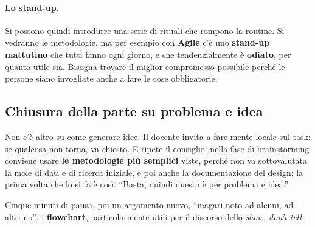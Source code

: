 \paragraph{Lo stand-up.} Si possono quindi introdurre una serie di rituali che
rompono la routine. Si vedranno le metodologie, ma per esempio con
\textbf{Agile} c'è uno \textbf{stand-up mattutino} che tutti fanno ogni
giorno, e che tendenzialmente è \textbf{odiato}, per quanto utile sia. Bisogna
trovare il miglior compromesso possibile perché le persone siano invogliate
anche a fare le cose obbligatorie.

\subsection{Chiusura della parte su problema e idea}

Non c'è altro su come generare idee. Il docente invita a fare mente locale
sul task: se qualcosa non torna, va chiesto. E ripete il consiglio: nella
fase di brainstorming conviene usare \textbf{le metodologie più semplici}
viste, perché non va sottovalutata la mole di dati e di ricerca iniziale, e
poi anche la documentazione del design; la prima volta che lo si fa è così.
``Basta, quindi questo è per problema e idea.''

Cinque minuti di pausa, poi un argomento nuovo, ``magari noto ad alcuni, ad
altri no'': i \textbf{flowchart}, particolarmente utili per il discorso dello
\emph{show, don't tell}.


